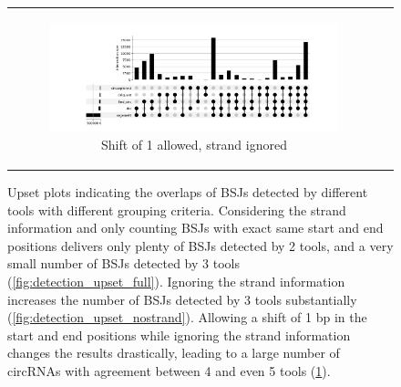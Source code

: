 \begin{figure}[ht]
\begin{tabular}{cc}
{\begin{subfigure}{\textwidth}
                \includegraphics[width=\linewidth]{chapters/4_results_and_discussion/figures/detection/min_samples_0/upset/diff_1_nostrand.png}
                \caption{Shift of 1 allowed, strand ignored}
                \label{fig:detection_upset_microshift}

            \end{subfigure}}
    \end{tabular}
    \caption{Upset plots indicating the overlaps of BSJs detected by different
        tools with different grouping criteria.
        Considering the strand information and only counting BSJs with exact same start
        and end positions delivers only plenty of BSJs detected by 2 tools, and a very
        small number of BSJs detected by 3 tools (\cref{fig:detection_upset_full}).
        Ignoring the strand information increases the number of BSJs detected by 3
        tools substantially (\cref{fig:detection_upset_nostrand}).
        Allowing a shift of 1 bp in the start and end positions while ignoring
        the strand information changes the results drastically, leading to a
        large number of circRNAs with agreement between 4 and even 5 tools
        (\cref{fig:detection_upset_microshift}).
    }
    \label{fig:detection_upset}
\end{figure}

